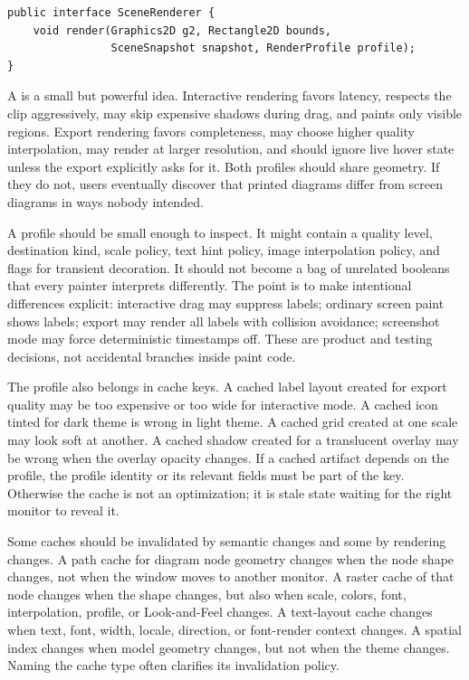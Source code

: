 \begin{lstlisting}[caption={Separating scene rendering from the Swing component.}]
public interface SceneRenderer {
    void render(Graphics2D g2, Rectangle2D bounds,
                SceneSnapshot snapshot, RenderProfile profile);
}
\end{lstlisting}

A  is a small but powerful idea. Interactive rendering favors latency, respects the clip aggressively, may skip expensive shadows during drag, and paints only visible regions. Export rendering favors completeness, may choose higher quality interpolation, may render at larger resolution, and should ignore live hover state unless the export explicitly asks for it. Both profiles should share geometry. If they do not, users eventually discover that printed diagrams differ from screen diagrams in ways nobody intended.

A profile should be small enough to inspect. It might contain a quality level, destination kind, scale policy, text hint policy, image interpolation policy, and flags for transient decoration. It should not become a bag of unrelated booleans that every painter interprets differently. The point is to make intentional differences explicit: interactive drag may suppress labels; ordinary screen paint shows labels; export may render all labels with collision avoidance; screenshot mode may force deterministic timestamps off. These are product and testing decisions, not accidental branches inside paint code.

The profile also belongs in cache keys. A cached label layout created for export quality may be too expensive or too wide for interactive mode. A cached icon tinted for dark theme is wrong in light theme. A cached grid created at one scale may look soft at another. A cached shadow created for a translucent overlay may be wrong when the overlay opacity changes. If a cached artifact depends on the profile, the profile identity or its relevant fields must be part of the key. Otherwise the cache is not an optimization; it is stale state waiting for the right monitor to reveal it.

Some caches should be invalidated by semantic changes and some by rendering changes. A path cache for diagram node geometry changes when the node shape changes, not when the window moves to another monitor. A raster cache of that node changes when the shape changes, but also when scale, colors, font, interpolation, profile, or Look-and-Feel changes. A text-layout cache changes when text, font, width, locale, direction, or font-render context changes. A spatial index changes when model geometry changes, but not when the theme changes. Naming the cache type often clarifies its invalidation policy.

